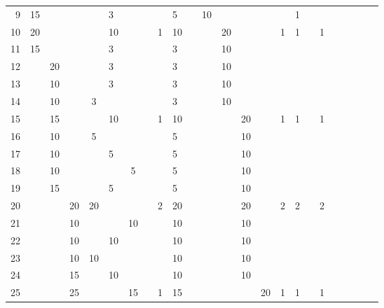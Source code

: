 \begin{table}[t]
\begin{center}
\begin{tabular}{r|g c g c g c g c g c g c g c g c g c g c g c g}
    9 & 15 &    &    &    &  3 &    &    &   &  5 &    & 10 &    &    &    &   & 1 &    &   &   &   &   &   &   \\
   10 & 20 &    &    &    & 10 &    &    & 1 & 10 &    &    & 20 &    &    & 1 & 1 &    & 1 &   &   &   &   &   \\
   11 & 15 &    &    &    &  3 &    &    &   &  3 &    &    & 10 &    &    &   &   &    &   &   &   &   &   &   \\
   12 &    & 20 &    &    &  3 &    &    &   &  3 &    &    & 10 &    &    &   &   &    &   &   &   &   &   &   \\
   13 &    & 10 &    &    &  3 &    &    &   &  3 &    &    & 10 &    &    &   &   &    &   &   &   &   &   &   \\
   14 &    & 10 &    &  3 &    &    &    &   &  3 &    &    & 10 &    &    &   &   &    &   &   &   &   &   &   \\
   15 &    & 15 &    &    & 10 &    &    & 1 & 10 &    &    &    & 20 &    & 1 & 1 &    & 1 &   &   &   &   &   \\
   16 &    & 10 &    &  5 &    &    &    &   &  5 &    &    &    & 10 &    &   &   &    &   &   &   &   &   &   \\
   17 &    & 10 &    &    &  5 &    &    &   &  5 &    &    &    & 10 &    &   &   &    &   &   &   &   &   &   \\
   18 &    & 10 &    &    &    &  5 &    &   &  5 &    &    &    & 10 &    &   &   &    &   &   &   &   &   &   \\
   19 &    & 15 &    &    &  5 &    &    &   &  5 &    &    &    & 10 &    &   &   &    &   &   &   &   &   &   \\
   20 &    &    & 20 & 20 &    &    &    & 2 & 20 &    &    &    & 20 &    & 2 & 2 &    & 2 &   &   &   &   &   \\
   21 &    &    & 10 &    &    & 10 &    &   & 10 &    &    &    & 10 &    &   &   &    &   &   &   &   &   &   \\
   22 &    &    & 10 &    & 10 &    &    &   & 10 &    &    &    & 10 &    &   &   &    &   &   &   &   &   &   \\
   23 &    &    & 10 & 10 &    &    &    &   & 10 &    &    &    & 10 &    &   &   &    &   &   &   &   &   &   \\
   24 &    &    & 15 &    & 10 &    &    &   & 10 &    &    &    & 10 &    &   &   &    &   &   &   &   &   &   \\
   25 &    &    & 25 &    &    & 15 &    & 1 & 15 &    &    &    &    & 20 & 1 & 1 &    & 1 &   &   &   &   &   \\

\end{tabular}
\end{center}
\end{table}
